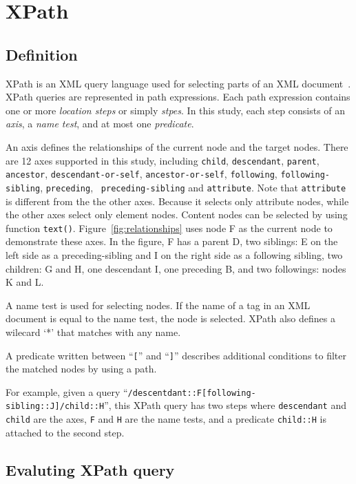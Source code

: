 \section{XPath}
\label{sec:xpath}

\subsection{Definition}

XPath is an XML query language used for selecting parts of an XML
document~\cite{xpath}. XPath queries are represented in path expressions. Each
path expression contains one or more \emph{location steps} or simply
\emph{stpes}. In this study, each step consists of an \emph{axis}, a \emph{name
test}, and at most one \emph{predicate}.

An axis defines the relationships of the current node and the target nodes.
There are 12 axes supported in this study, including  \texttt{child},
\texttt{descendant}, \texttt{parent}, \texttt{ancestor},
\texttt{descendant-or-self}, \texttt{ancestor-or-self}, \texttt{following},
\texttt{following-sibling}, \texttt{preceding}, \texttt{ preceding-sibling}  and
\texttt{attribute}. Note that \texttt{attribute} is different from the the other
axes. Because it selects only attribute nodes, while the other axes select only
element nodes. Content nodes can be selected by using function \texttt{text()}.
Figure~\ref{fig:relationships} uses node F as the current node to demonstrate
these axes. In the figure, F has a parent D, two siblings: E  on the left side
as a preceding-sibling and I on the right side as a following sibling, two
children: G and H, one descendant I, one preceding B, and two followings: nodes
K and L.

A name test is used for selecting nodes. If the name of a tag in an XML document
is equal to the name test, the node is selected. XPath also defines a wilecard  `*'
that matches with any name.

A predicate written between ``\verb|[|'' and ``\verb|]|'' describes additional
conditions to filter the matched nodes by using a path.

For example, given a query
``\verb|/descentdant::F[following-sibling::J]/child::H|'', this XPath query has
two steps where \verb|descendant| and \verb|child| are the axes, \verb|F| and
\verb|H| are the name tests, and a predicate \verb|child::H| is attached to the
second step.

\subsection{Evaluting XPath query}


